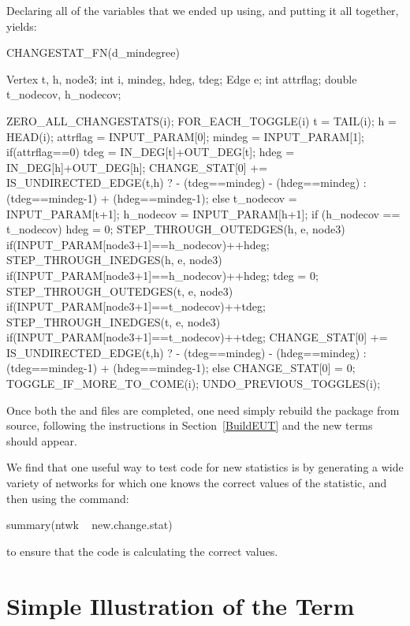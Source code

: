 \documentclass[nojss]{jss}
\begin{document}
Declaring all of the variables that we ended up using, and putting it all
together, yields:
\begin{CodeChunk}
\begin{CodeInput}
CHANGESTAT_FN(d_mindegree) {
  Vertex t, h, node3;
  int i, mindeg, hdeg, tdeg;
  Edge e;
  int attrflag;
  double t_nodecov, h_nodecov;

  ZERO_ALL_CHANGESTATS(i);
  FOR_EACH_TOGGLE(i) {
    t = TAIL(i); h = HEAD(i);
    attrflag = INPUT_PARAM[0];
    mindeg = INPUT_PARAM[1];
    if(attrflag==0){
      tdeg = IN_DEG[t]+OUT_DEG[t];
      hdeg = IN_DEG[h]+OUT_DEG[h];
      CHANGE_STAT[0] += IS_UNDIRECTED_EDGE(t,h) ?
        - (tdeg==mindeg) - (hdeg==mindeg) :
        (tdeg==mindeg-1) + (hdeg==mindeg-1);
    }else{
      t_nodecov = INPUT_PARAM[t+1];
      h_nodecov = INPUT_PARAM[h+1];
      if (h_nodecov == t_nodecov) {
        hdeg = 0;
        STEP_THROUGH_OUTEDGES(h, e, node3) { 
          if(INPUT_PARAM[node3+1]==h_nodecov){++hdeg;}
        }
        STEP_THROUGH_INEDGES(h, e, node3) { 
          if(INPUT_PARAM[node3+1]==h_nodecov){++hdeg;}
        }
        tdeg = 0;
        STEP_THROUGH_OUTEDGES(t, e, node3) { 
          if(INPUT_PARAM[node3+1]==t_nodecov){++tdeg;}
        }
        STEP_THROUGH_INEDGES(t, e, node3) { 
          if(INPUT_PARAM[node3+1]==t_nodecov){++tdeg;}
        }
        CHANGE_STAT[0] += IS_UNDIRECTED_EDGE(t,h) ?
          - (tdeg==mindeg) - (hdeg==mindeg) :
          (tdeg==mindeg-1) + (hdeg==mindeg-1);
      }else{
        CHANGE_STAT[0] = 0;
      }
    }
    TOGGLE_IF_MORE_TO_COME(i);
  }
  UNDO_PREVIOUS_TOGGLES(i);
}
\end{CodeInput}
\end{CodeChunk}
Once both the  and  files are completed, one need simply rebuild the package from source, following the instructions in Section~\ref{BuildEUT} and the new terms should appear.

We find that one useful way to test code for new statistics is by generating a wide variety of networks for which one knows the correct values of the statistic, and then using the command:
\begin{CodeChunk}
\begin{CodeInput}
summary(ntwk ~ new.change.stat)
\end{CodeInput}
\end{CodeChunk}
to ensure that the code is calculating the correct values.

\section[Simple Illustration of the mindegree Term]
{Simple Illustration of the  Term}
\end{document}
